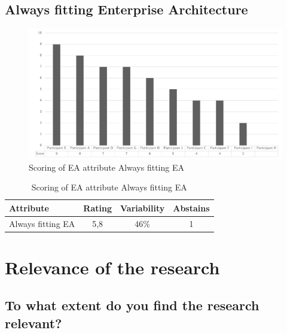 \subsection{Always fitting Enterprise Architecture}
\begin{figure}[H]
	\centering
	\includegraphics[width=0.9\linewidth]{images/scoreeaalwaysfitea}
	\caption[Scoring of EA attribute Always fitting EA]{Scoring of EA attribute Always fitting EA}
	\label{fig:appscoringeaalwaysfitea}
\end{figure}
\begin{table}[H]
	\centering
	\begin{tabular}{p{}ccc}
		\toprule
		\textbf{Attribute} & \textbf{Rating} & \textbf{Variability} & \textbf{Abstains} \\
		\midrule
		Always fitting EA & 5,8 & 46\% & 1 \\%
		\bottomrule
	\end{tabular}%
	\caption[Scoring of EA attribute Always fitting EA]{Scoring of EA attribute Always fitting EA}
	\label{tab:appscoringeaalwaysfitea}%
\end{table}%

\section{Relevance of the research}
\label{sec:relevanceofresearchandexpectations}

\subsection{To what extent do you find the research relevant?}
\label{sub:relevantgeneric}

